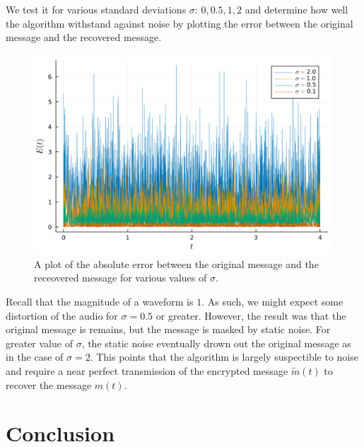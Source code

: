 \documentclass[12pt]{article}
\begin{document}
    We test it for various standard deviations $\sigma$: $0, 0.5, 1, 2$ and determine how well the algorithm withstand against noise by plotting the error between the original message and the recovered message. 
    \begin{figure}[H]
        \includegraphics[width=\linewidth]{error_plot_noise.png}
        \centering
        \caption{A plot of the absolute error between the original message and the receovered message for various values of $\sigma$.}
    \end{figure}
    Recall that the magnitude of a waveform is $1$. As such, we might expect some distortion of the audio for $\sigma = 0.5$ or greater. However, the result was that the original message is remains, but the message is masked by static noise. For greater value of $\sigma$, the static noise eventually drown out the original message as in the case of $\sigma = 2$. This points that the algorithm is largely suspectible to noise and require a near perfect transmission of the encrypted message $\widetilde{m}(t)$ to recover the message $m(t)$. 


    \section{Conclusion}
  \newpage    
    \printbibliography
\end{document}
